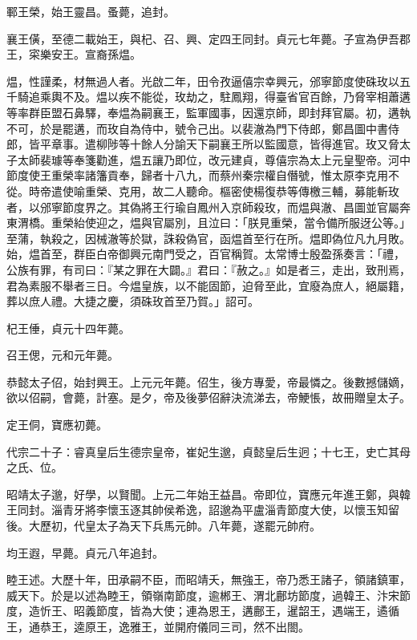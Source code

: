 \begin{pinyinscope}
 鄆王榮，始王靈昌。蚤薨，追封。



 襄王僙，至德二載始王，與杞、召、興、定四王同封。貞元七年薨。子宣為伊吾郡王，寀樂安王。宣裔孫煴。



 煴，性謹柔，材無過人者。光啟二年，田令孜逼僖宗幸興元，邠寧節度使硃玫以五千騎追乘輿不及。煴以疾不能從，玫劫之，駐鳳翔，得臺省官百餘，乃脅宰相蕭遘等率群臣盟石鼻驛，奉煴為嗣襄王，監軍國事，因還京師，即封拜官屬。初，遘執不可，於是罷遘，而玫自為侍中，號令己出。以裴澈為門下侍郎，鄭昌圖中書侍郎，皆平章事。遣柳陟等十餘人分諭天下嗣襄王所以監國意，皆得進官。玫又脅太子太師裴璩等奉箋勸進，煴五讓乃即位，改元建貞，尊僖宗為太上元皇聖帝。河中節度使王重榮率諸籓貢奉，歸者十八九，而蔡州秦宗權自僭號，惟太原李克用不從。時帝遣使喻重榮、克用，故二人聽命。樞密使楊復恭等傳檄三輔，募能斬玫者，以邠寧節度界之。其偽將王行瑜自鳳州入京師殺玫，而煴與澈、昌圖並官屬奔東渭橋。重榮紿使迎之，煴與官屬別，且泣曰：「朕見重榮，當令備所服迓公等。」至蒲，執殺之，因械澈等於獄，誅殺偽官，函煴首至行在所。煴即偽位凡九月敗。始，煴首至，群臣白帝御興元南門受之，百官稱賀。太常博士殷盈孫奏言：「禮，公族有罪，有司曰：『某之罪在大闢。』君曰：『赦之。』如是者三，走出，致刑焉，君為素服不舉者三日。今煴皇族，以不能固節，迫脅至此，宜廢為庶人，絕屬籍，葬以庶人禮。大捷之慶，須硃玫首至乃賀。」詔可。



 杞王倕，貞元十四年薨。



 召王偲，元和元年薨。



 恭懿太子佋，始封興王。上元元年薨。佋生，後方專愛，帝最憐之。後數撼儲嫡，欲以佋嗣，會薨，計塞。是夕，帝及後夢佋辭決流涕去，帝鯁悵，故冊贈皇太子。



 定王侗，寶應初薨。



 代宗二十子：睿真皇后生德宗皇帝，崔妃生邈，貞懿皇后生迥；十七王，史亡其母之氏、位。



 昭靖太子邈，好學，以賢聞。上元二年始王益昌。帝即位，寶應元年進王鄭，與韓王同封。淄青牙將李懷玉逐其帥侯希逸，詔邈為平盧淄青節度大使，以懷玉知留後。大歷初，代皇太子為天下兵馬元帥。八年薨，遂罷元帥府。



 均王遐，早薨。貞元八年追封。



 睦王述。大歷十年，田承嗣不臣，而昭靖夭，無強王，帝乃悉王諸子，領諸鎮軍，威天下。於是以述為睦王，領嶺南節度，逾郴王、渭北鄜坊節度，過韓王、汴宋節度，造忻王、昭義節度，皆為大使；連為恩王，遘鄜王，暹韶王，遇端王，遹循王，通恭王，逵原王，逸雅王，並開府儀同三司，然不出閤。




\end{pinyinscope}
